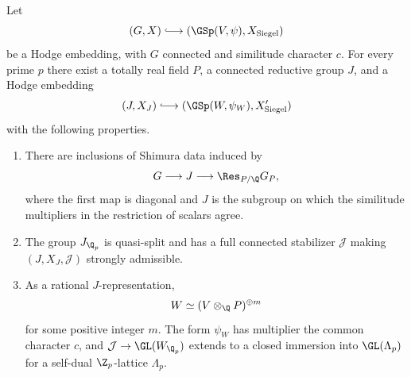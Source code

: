 \begin{lemma}
\label{lem:auxiliary-datum}
Let
\[
 (G,X)\lhook\joinrel\longrightarrow
 (\GSp(V,\psi),X_{\mathrm{Siegel}})
\]
be a Hodge embedding, with $G$ connected and similitude character $c$.
For every prime $p$ there exist a totally real field $P$, a connected
reductive group $J$, and a Hodge embedding
\[
 (J,X_J)\lhook\joinrel\longrightarrow
 (\GSp(W,\psi_W),X'_{\mathrm{Siegel}})
\]
with the following properties.
\begin{enumerate}
\item There are inclusions of Shimura data induced by
\[
 G\longrightarrow J\longrightarrow\Res_{P/\Q}G_P,
\]
where the first map is diagonal and $J$ is the subgroup on which the
similitude multipliers in the restriction of scalars agree.
\item The group $J_{\Q_p}$ is quasi-split and has a full connected
stabilizer $\mathcal J$ making $(J,X_J,\mathcal J)$ strongly admissible.
\item As a rational $J$-representation,
\begin{equation}
 W\simeq (V\otimes_{\Q}P)^{\oplus m}
 \label{eq:transport-copies}
\end{equation}
for some positive integer $m$.  The form $\psi_W$ has multiplier the
common character $c$, and $\mathcal J\to\GL(W_{\Q_p})$ extends to a
closed immersion into $\GL(\Lambda_p)$ for a self-dual $\Z_p$-lattice
$\Lambda_p$.
\end{enumerate}
\end{lemma}


